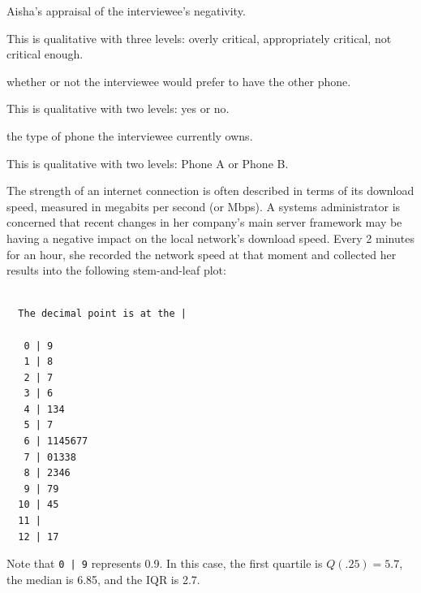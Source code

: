 \documentclass{examsetup}\usepackage[]{graphicx}\usepackage[]{color}
\makeatletter
\newenvironment{kframe}{%
 \def\at@end@of@kframe{}%
 \ifinner\ifhmode%
  \def\at@end@of@kframe{\end{minipage}}%
  \begin{minipage}{\columnwidth}%
 \fi\fi%
 \def\FrameCommand##1{\hskip\@totalleftmargin \hskip-\fboxsep
 \colorbox{shadecolor}{##1}\hskip-\fboxsep
     \hskip-\linewidth \hskip-\@totalleftmargin \hskip\columnwidth}%
 \MakeFramed {\advance\hsize-\width
   \@totalleftmargin\z@ \linewidth\hsize
   \@setminipage}}%
 {\par\unskip\endMakeFramed%
 \at@end@of@kframe}
\newenvironment{knitrout}{}{} %
\makeatother
\begin{document}
\begin{questions}
\begin{parts}
\begin{subparts}
      \subpart Aisha's appraisal of the interviewee's negativity.
      \begin{solution}
      This is qualitative with three levels: overly critical, appropriately critical, not critical enough.
      \end{solution}

      \subpart whether or not the interviewee would prefer to have the other phone.
      \begin{solution}
      This is qualitative with two levels: yes or no.
      \end{solution}

      \subpart the type of phone the interviewee currently owns.
      \begin{solution}
      This is qualitative with two levels: Phone A or Phone B.
      \end{solution}

   \end{subparts}

\end{parts}
\pagebreak

\question 



The strength of an internet connection is often described in terms of its download speed, measured in megabits per second (or Mbps).
A systems administrator is concerned that recent changes in her company's main server framework may be having a negative impact on the local network's download speed.
Every 2 minutes for an hour, she recorded the network speed at that moment and collected her results into the following stem-and-leaf plot:

\begin{knitrout}
\color{fgcolor}\begin{kframe}
\begin{verbatim}

  The decimal point is at the |

   0 | 9
   1 | 8
   2 | 7
   3 | 6
   4 | 134
   5 | 7
   6 | 1145677
   7 | 01338
   8 | 2346
   9 | 79
  10 | 45
  11 | 
  12 | 17
\end{verbatim}
\end{kframe}
\end{knitrout}

Note that \verb!0 | 9! represents 0.9. In this case, the first quartile is $Q(.25) = 5.7$, the median is 6.85, and the IQR is 2.7.


\end{questions}
\end{document}
